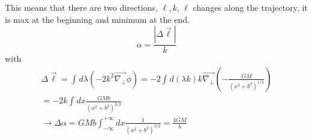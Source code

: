 This means that there are two directions, $\ell, k$, $\ell$ changes along the trajectory, it is max at the beginning and minimum at the end.
\[
	\alpha = \frac{|\Delta \vec{\ell}|}{k}
\]
with
\begin{gather*}
	\Delta \vec{\ell} = \int_{}^{}{d\lambda  \left( -2k^{2}\vec{\nabla _{\bot}} \phi  \right)} = -2 \int_{}^{}{d\left( \lambda k \right)k \vec{\nabla _{\bot}} \left( - \frac{GM}{\left( x^{2}+b^{2} \right)^{1/2}} \right)}\\
	= -2k \int_{}^{}{dx \frac{GMb}{\left( x^{2}+b^{2} \right)^{3/2}}} \\
	\to \Delta \alpha = GMb\int_{-\infty}^{+\infty}{dx \frac{1}{\left( x^{2}+b^{2} \right)^{3/2}}} = \frac{4GM}{b}
\end{gather*}











